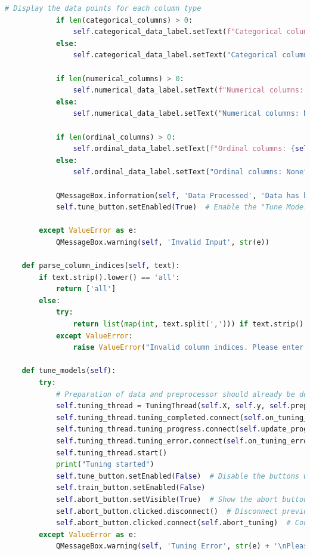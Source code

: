 \documentclass[letterpaper,10pt]{article}
\begin{document}
\begin{lstlisting}[language=Python, caption=ui.py - Final structure after refactoring. ]
            # Display the data points for each column type
            if len(categorical_columns) > 0:
                self.categorical_data_label.setText(f"Categorical columns: {self.X[0][categorical_columns]}")
            else:
                self.categorical_data_label.setText("Categorical columns: None")

            if len(numerical_columns) > 0:
                self.numerical_data_label.setText(f"Numerical columns: {self.X[0][numerical_columns]}")
            else:
                self.numerical_data_label.setText("Numerical columns: None")

            if len(ordinal_columns) > 0:
                self.ordinal_data_label.setText(f"Ordinal columns: {self.X[0][ordinal_columns]}")
            else:
                self.ordinal_data_label.setText("Ordinal columns: None")

            QMessageBox.information(self, 'Data Processed', 'Data has been processed successfully.')
            self.tune_button.setEnabled(True)  # Enable the "Tune Models" button

        except ValueError as e:
            QMessageBox.warning(self, 'Invalid Input', str(e))

    def parse_column_indices(self, text):
        if text.strip().lower() == 'all':
            return ['all']
        else:
            try:
                return list(map(int, text.split(','))) if text.strip() else []
            except ValueError:
                raise ValueError("Invalid column indices. Please enter valid integers separated by commas.")
    
    def tune_models(self):
        try:
            # Preparation of data and preprocessor should already be done
            self.tuning_thread = TuningThread(self.X, self.y, self.preprocessor)
            self.tuning_thread.tuning_completed.connect(self.on_tuning_completed)
            self.tuning_thread.tuning_progress.connect(self.update_progress)  # Connect progress signal
            self.tuning_thread.tuning_error.connect(self.on_tuning_error)
            self.tuning_thread.start()
            print("Tuning started")
            self.tune_button.setEnabled(False)  # Disable the buttons while tuning is in progress
            self.train_button.setEnabled(False)
            self.abort_button.setVisible(True)  # Show the abort button
            self.abort_button.clicked.disconnect()  # Disconnect previous connection
            self.abort_button.clicked.connect(self.abort_tuning)  # Connect abort button to tuning abort
        except ValueError as e:
            QMessageBox.warning(self, 'Tuning Error', str(e) + '\nPlease check if the columns were inputted correctly during the preprocessing phase.')



\end{lstlisting}
\end{document}
